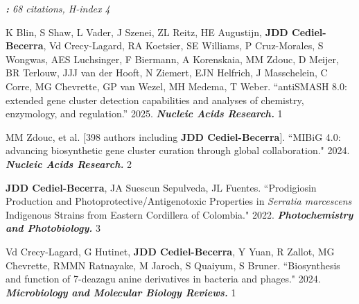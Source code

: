 
\textit{\textbf{:} 68 citations, H-index 4}

 \vspace{-2mm}

\begin{cvpubs}
\cvpub
{K Blin, S Shaw, L Vader, J Szenei, ZL Reitz, HE Augustijn, \textbf{JDD Cediel-Becerra}, Vd Crecy-Lagard, RA Koetsier, SE Williams, P Cruz-Morales, S Wongwas, AES Luchsinger, F Biermann, A Korenskaia, MM Zdouc, D Meijer, BR Terlouw, JJJ van der Hooft, N Ziemert, EJN Helfrich, J Masschelein, C Corre, MG Chevrette, GP van Wezel, MH Medema, T Weber. ``antiSMASH 8.0: extended gene cluster detection capabilities and analyses of chemistry, enzymology, and regulation.'' 2025. \textit{\textbf{Nucleic Acids Research.}} \textit{\textbf{}}}
{1}

\cvpub
{MM Zdouc, et al. [398 authors including \textbf{JDD Cediel-Becerra}]. ``MIBiG 4.0: advancing biosynthetic gene cluster curation through global collaboration." 2024. \textit{\textbf{Nucleic Acids Research.}} \textit{\textbf{}}}
{2}

\cvpub
{\textbf{JDD Cediel-Becerra}, JA Suescun Sepulveda, JL Fuentes. ``Prodigiosin Production and Photoprotective/Antigenotoxic Properties in \textit{Serratia marcescens} Indigenous Strains from Eastern Cordillera of Colombia." 2022. \textit{\textbf{Photochemistry and Photobiology.}}\textit{\textbf{}}}
{3}
\end{cvpubs}


 \vspace{-2mm}

\begin{cvpubs}


\cvpub
{Vd Crecy-Lagard, G Hutinet, \textbf{JDD Cediel-Becerra}, Y Yuan, R Zallot, MG Chevrette, RMMN Ratnayake, M Jaroch, S Quaiyum, S Bruner. ``Biosynthesis and function of 7-deazagu
anine derivatives in bacteria and phages." 2024. \textit{\textbf{Microbiology and Molecular Biology Reviews.}}\textit{\textbf{}}}
{1}

\end{cvpubs}

